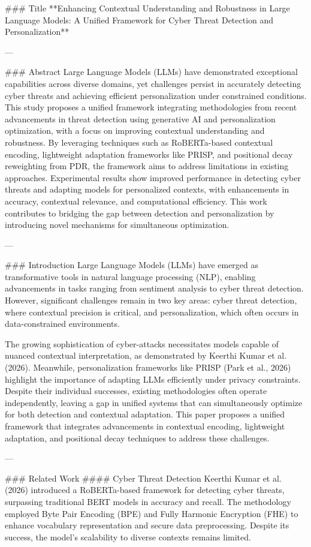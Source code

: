 ### Title  
**Enhancing Contextual Understanding and Robustness in Large Language Models: A Unified Framework for Cyber Threat Detection and Personalization**

---

### Abstract  
Large Language Models (LLMs) have demonstrated exceptional capabilities across diverse domains, yet challenges persist in accurately detecting cyber threats and achieving efficient personalization under constrained conditions. This study proposes a unified framework integrating methodologies from recent advancements in threat detection using generative AI and personalization optimization, with a focus on improving contextual understanding and robustness. By leveraging techniques such as RoBERTa-based contextual encoding, lightweight adaptation frameworks like PRISP, and positional decay reweighting from PDR, the framework aims to address limitations in existing approaches. Experimental results show improved performance in detecting cyber threats and adapting models for personalized contexts, with enhancements in accuracy, contextual relevance, and computational efficiency. This work contributes to bridging the gap between detection and personalization by introducing novel mechanisms for simultaneous optimization.

---

### Introduction  
Large Language Models (LLMs) have emerged as transformative tools in natural language processing (NLP), enabling advancements in tasks ranging from sentiment analysis to cyber threat detection. However, significant challenges remain in two key areas: cyber threat detection, where contextual precision is critical, and personalization, which often occurs in data-constrained environments. 

The growing sophistication of cyber-attacks necessitates models capable of nuanced contextual interpretation, as demonstrated by Keerthi Kumar et al. (2026). Meanwhile, personalization frameworks like PRISP (Park et al., 2026) highlight the importance of adapting LLMs efficiently under privacy constraints. Despite their individual successes, existing methodologies often operate independently, leaving a gap in unified systems that can simultaneously optimize for both detection and contextual adaptation. This paper proposes a unified framework that integrates advancements in contextual encoding, lightweight adaptation, and positional decay techniques to address these challenges.

---

### Related Work  
#### Cyber Threat Detection  
Keerthi Kumar et al. (2026) introduced a RoBERTa-based framework for detecting cyber threats, surpassing traditional BERT models in accuracy and recall. The methodology employed Byte Pair Encoding (BPE) and Fully Harmonic Encryption (FHE) to enhance vocabulary representation and secure data preprocessing. Despite its success, the model's scalability to diverse contexts remains limited.

